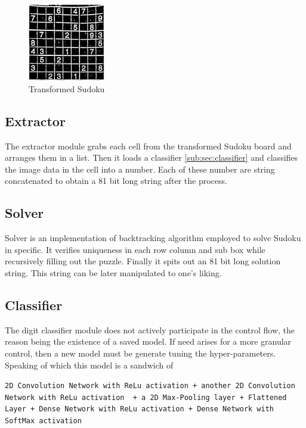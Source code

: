 \documentclass[twocolumn, switch]{article} %
\begin{document}
\begin{figure}[!htbp]
    \centering
    \includegraphics[width=0.3\textwidth]{transformed.jpg}
    \caption[Transformed Sudoku]{Transformed Sudoku}
    \label{fig:3.5}
\end{figure}

\subsection{Extractor}
\label{sub:sec:extractor}
The extractor module grabs each cell from the transformed Sudoku board and arranges them in a list. Then it loads a classifier \eqref{sub:sec:classifier} and classifies the image data in the cell into a number. Each of these number are string concatenated to obtain a 81 bit long string after the process.

\subsection{Solver}
\label{sub:sec:solver}
Solver is an implementation of backtracking algorithm employed to solve Sudoku in specific. It verifies uniqueness in each row column and sub box while recursively filling out the puzzle. Finally it spits out an 81 bit long solution string. This string can be later manipulated to one's liking.

\subsection{Classifier}
\label{sub:sec:classifier}
The digit classifier module does not actively participate in the control flow, the reason being the existence of a saved model. If need arises for a more granular control, then a new model must be generate tuning the hyper-parameters. Speaking of which this model is a sandwich of

\lstinline{2D Convolution Network with ReLu activation + another 2D Convolution Network with ReLu activation  + a 2D Max-Pooling layer + Flattened Layer + Dense Network with ReLu activation + Dense Network with SoftMax activation}
\end{document}
